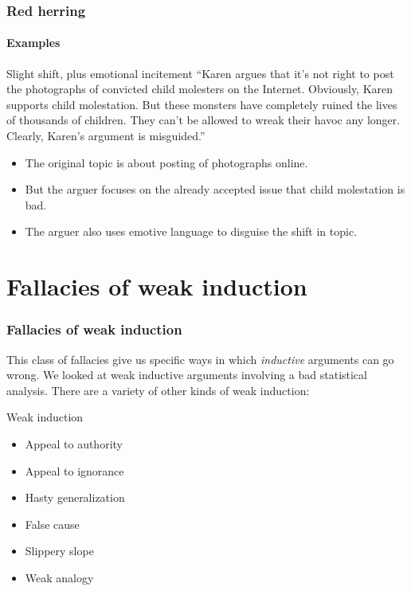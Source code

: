 \documentclass[10pt,letterpaper,xcolor=dvipsnames]{beamer}
\begin{document}
\begin{frame}
  \frametitle{Red herring}
  \framesubtitle{Examples}
  
  \begin{block}{Slight shift, plus emotional incitement}
  ``Karen argues that it's not right to post the photographs of convicted child molesters on the Internet.  Obviously, Karen supports child molestation.  But these monsters have completely ruined the lives of thousands of children.  They can't be allowed to wreak their havoc any longer.  Clearly, Karen's argument is misguided.''
  \end{block}
  
  \begin{itemize}
    \item<2-> The original topic is about posting of photographs online.
    \item<2-> But the arguer focuses on the already accepted issue that child molestation is bad.
    \item<2-> The arguer also uses emotive language to disguise the shift in topic. 
  \end{itemize}
  
\end{frame}

\section{Fallacies of weak induction}

\begin{frame}
  \frametitle{Fallacies of weak induction}
  
  This class of fallacies give us specific ways in which \textit{inductive} arguments can go wrong.  We looked at weak inductive arguments involving a bad statistical analysis.  There are a variety of other kinds of weak induction:
  
  \begin{block}{Weak induction}
    \begin{itemize}
      \item Appeal to authority
      \item Appeal to ignorance
      \item Hasty generalization
      \item False cause
      \item Slippery slope
      \item Weak analogy
    \end{itemize}
  \end{block}
  
\end{frame}
\end{document}
